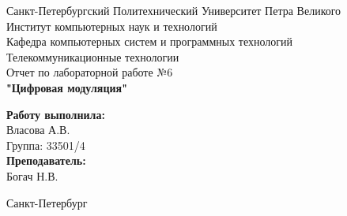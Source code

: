 \documentclass[a4paper]{article}
\begin{document}

\begin{titlepage}	%

	\begin{center}		%

		\large Санкт-Петербургский Политехнический Университет Петра Великого\\
		\large Институт компьютерных наук и технологий \\
		\large Кафедра компьютерных систем и программных технологий\\[6cm]
		
		\huge Телекоммуникационные технологии\\[0.5cm] %
		\large Отчет по лабораторной работе №6 \\[0.2cm]
		\large\textbf{"Цифровая модуляция"}\\[5cm]

	\end{center}


	\begin{flushright} %
		\begin{minipage}{0.25\textwidth} %
			\begin{flushleft} %

				\large\textbf{Работу выполнила:}\\
				\large Власова А.В.\\
				\large {Группа:} 33501/4\\
				
				\large \textbf{Преподаватель:}\\
				\large Богач Н.В.\

			\end{flushleft}
		\end{minipage}
	\end{flushright}
	
	\vfill %

	\begin{center}
	\large Санкт-Петербург\\
	\large \the\year %
	\end{center} %

\thispagestyle{empty} %
\end{titlepage} %
\end{document}
